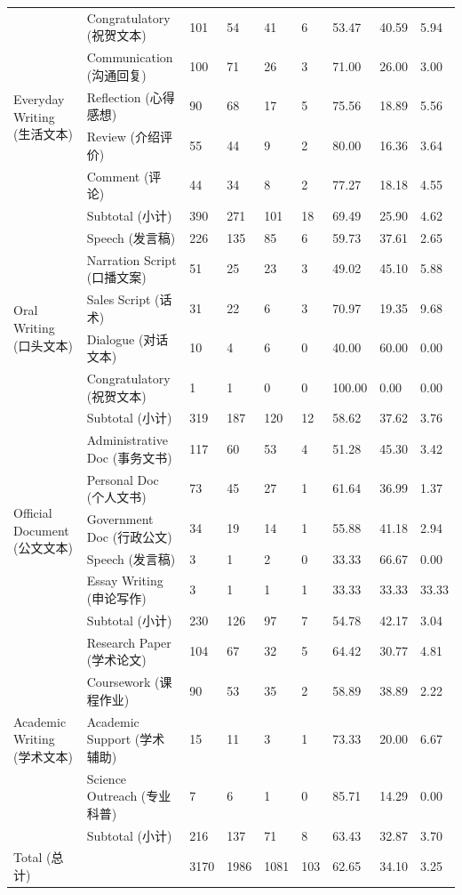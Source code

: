 \documentclass[
  10
]{article}
\begin{document}
{\begin{longtable}[]{@{}lllllllll@{}}
\multirow{6}{*}{Everyday Writing (生活文本)} & Congratulatory (祝贺文本)
& 101 & 54 & 41 & 6 & 53.47 & 40.59 & 5.94 \\
& Communication (沟通回复) & 100 & 71 & 26 & 3 & 71.00 & 26.00 & 3.00 \\
& Reflection (心得感想) & 90 & 68 & 17 & 5 & 75.56 & 18.89 & 5.56 \\
& Review (介绍评价) & 55 & 44 & 9 & 2 & 80.00 & 16.36 & 3.64 \\
& Comment (评论) & 44 & 34 & 8 & 2 & 77.27 & 18.18 & 4.55 \\
& Subtotal (小计) & 390 & 271 & 101 & 18 & 69.49 & 25.90 & 4.62 \\
\multirow{6}{*}{Oral Writing (口头文本)} & Speech (发言稿) & 226 & 135 &
85 & 6 & 59.73 & 37.61 & 2.65 \\
& Narration Script (口播文案) & 51 & 25 & 23 & 3 & 49.02 & 45.10 &
5.88 \\
& Sales Script (话术) & 31 & 22 & 6 & 3 & 70.97 & 19.35 & 9.68 \\
& Dialogue (对话文本) & 10 & 4 & 6 & 0 & 40.00 & 60.00 & 0.00 \\
& Congratulatory (祝贺文本) & 1 & 1 & 0 & 0 & 100.00 & 0.00 & 0.00 \\
& Subtotal (小计) & 319 & 187 & 120 & 12 & 58.62 & 37.62 & 3.76 \\
\multirow{6}{*}{Official Document (公文文本)} & Administrative Doc
(事务文书) & 117 & 60 & 53 & 4 & 51.28 & 45.30 & 3.42 \\
& Personal Doc (个人文书) & 73 & 45 & 27 & 1 & 61.64 & 36.99 & 1.37 \\
& Government Doc (行政公文) & 34 & 19 & 14 & 1 & 55.88 & 41.18 & 2.94 \\
& Speech (发言稿) & 3 & 1 & 2 & 0 & 33.33 & 66.67 & 0.00 \\
& Essay Writing (申论写作) & 3 & 1 & 1 & 1 & 33.33 & 33.33 & 33.33 \\
& Subtotal (小计) & 230 & 126 & 97 & 7 & 54.78 & 42.17 & 3.04 \\
\multirow{5}{*}{Academic Writing (学术文本)} & Research Paper (学术论文)
& 104 & 67 & 32 & 5 & 64.42 & 30.77 & 4.81 \\
& Coursework (课程作业) & 90 & 53 & 35 & 2 & 58.89 & 38.89 & 2.22 \\
& Academic Support (学术辅助) & 15 & 11 & 3 & 1 & 73.33 & 20.00 &
6.67 \\
& Science Outreach (专业科普) & 7 & 6 & 1 & 0 & 85.71 & 14.29 & 0.00 \\
& Subtotal (小计) & 216 & 137 & 71 & 8 & 63.43 & 32.87 & 3.70 \\
Total (总计) & & 3170 & 1986 & 1081 & 103 & 62.65 & 34.10 & 3.25 \\
\end{longtable}
}
\end{document}
